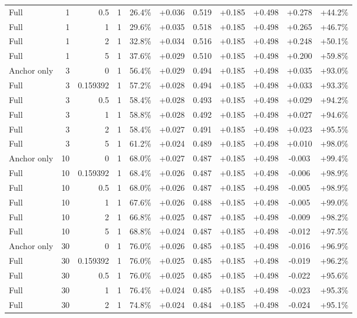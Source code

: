 \begin{table}[htbp]
\begin{tabular}{lrrrccccccc}
Full & 1 & 0.5 & 1 & 26.4\% & +0.036 & 0.519 & +0.185 & +0.498 & +0.278 & +44.2\% \\
Full & 1 & 1 & 1 & 29.6\% & +0.035 & 0.518 & +0.185 & +0.498 & +0.265 & +46.7\% \\
Full & 1 & 2 & 1 & 32.8\% & +0.034 & 0.516 & +0.185 & +0.498 & +0.248 & +50.1\% \\
Full & 1 & 5 & 1 & 37.6\% & +0.029 & 0.510 & +0.185 & +0.498 & +0.200 & +59.8\% \\
Anchor only & 3 & 0 & 1 & 56.4\% & +0.029 & 0.494 & +0.185 & +0.498 & +0.035 & +93.0\% \\
Full & 3 & 0.159392 & 1 & 57.2\% & +0.028 & 0.494 & +0.185 & +0.498 & +0.033 & +93.3\% \\
Full & 3 & 0.5 & 1 & 58.4\% & +0.028 & 0.493 & +0.185 & +0.498 & +0.029 & +94.2\% \\
Full & 3 & 1 & 1 & 58.8\% & +0.028 & 0.492 & +0.185 & +0.498 & +0.027 & +94.6\% \\
Full & 3 & 2 & 1 & 58.4\% & +0.027 & 0.491 & +0.185 & +0.498 & +0.023 & +95.5\% \\
Full & 3 & 5 & 1 & 61.2\% & +0.024 & 0.489 & +0.185 & +0.498 & +0.010 & +98.0\% \\
Anchor only & 10 & 0 & 1 & 68.0\% & +0.027 & 0.487 & +0.185 & +0.498 & -0.003 & +99.4\% \\
Full & 10 & 0.159392 & 1 & 68.4\% & +0.026 & 0.487 & +0.185 & +0.498 & -0.006 & +98.9\% \\
Full & 10 & 0.5 & 1 & 68.0\% & +0.026 & 0.487 & +0.185 & +0.498 & -0.005 & +98.9\% \\
Full & 10 & 1 & 1 & 67.6\% & +0.026 & 0.488 & +0.185 & +0.498 & -0.005 & +99.0\% \\
Full & 10 & 2 & 1 & 66.8\% & +0.025 & 0.487 & +0.185 & +0.498 & -0.009 & +98.2\% \\
Full & 10 & 5 & 1 & 68.8\% & +0.024 & 0.487 & +0.185 & +0.498 & -0.012 & +97.5\% \\
Anchor only & 30 & 0 & 1 & 76.0\% & +0.026 & 0.485 & +0.185 & +0.498 & -0.016 & +96.9\% \\
Full & 30 & 0.159392 & 1 & 76.0\% & +0.025 & 0.485 & +0.185 & +0.498 & -0.019 & +96.2\% \\
Full & 30 & 0.5 & 1 & 76.0\% & +0.025 & 0.485 & +0.185 & +0.498 & -0.022 & +95.6\% \\
Full & 30 & 1 & 1 & 76.4\% & +0.024 & 0.485 & +0.185 & +0.498 & -0.023 & +95.3\% \\
Full & 30 & 2 & 1 & 74.8\% & +0.024 & 0.484 & +0.185 & +0.498 & -0.024 & +95.1\% \\

\end{tabular}
\end{table}
